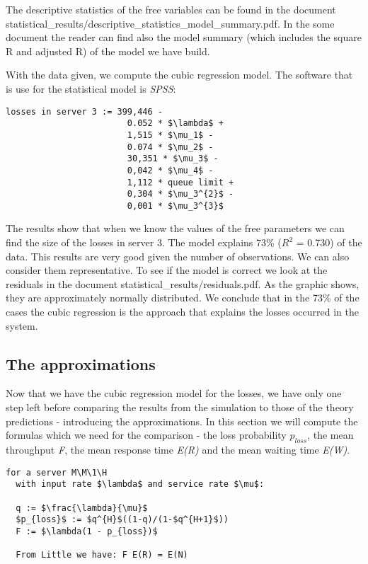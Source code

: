 \documentclass[12pt]{article}
\theoremstyle{plain}
\begin{document}
The descriptive statistics of the free variables can be found in the document
statistical\_results/descriptive\_statistics\_model\_summary.pdf. In the some document
the reader can find also the model summary (which includes the square R and
adjusted R) of the model we have build.


With the data given, we compute the cubic regression model. The software that is
use for the statistical model is \emph{SPSS}:\\

\begin{lstlisting}[frame=single]
  losses in server 3 := 399,446 -
                        0.052 * $\lambda$ +
                        1,515 * $\mu_1$ -
                        0.074 * $\mu_2$ -
                        30,351 * $\mu_3$ -
                        0,042 * $\mu_4$ -
                        1,112 * queue limit +
                        0,304 * $\mu_3^{2}$ -
                        0,001 * $\mu_3^{3}$
\end{lstlisting}

The results show that when we know the values of the free parameters we can find
the size of the losses in server 3. The model explains 73\% ($R^{2}$ = 0.730) of the data. This
results are very good given the number of observations. We can also consider them representative. 
To see if the model is correct we look at the residuals in the document statistical\_results/residuals.pdf.
As the graphic shows, they are approximately normally distributed. We conclude that in the 73\% of the cases the cubic
regression is the approach that explains the losses occurred in the system.

\subsection*{The approximations}

Now that we have the cubic regression model for the losses, we have only one
step left before comparing the results from the simulation to those of the
theory predictions - introducing the approximations. In this section we will
compute the formulas which we need for the comparison - the loss probability
$p_{loss}$, the mean throughput \emph{F}, the mean response time \emph{E(R)}
and the mean waiting time \emph{E(W)}.

\begin{lstlisting}[frame=single]
  for a server M\M\1\H
  with input rate $\lambda$ and service rate $\mu$:

  q := $\frac{\lambda}{\mu}$
  $p_{loss}$ := $q^{H}$((1-q)/(1-$q^{H+1}$))
  F := $\lambda(1 - p_{loss})$
  
  From Little we have: F E(R) = E(N)
\end{lstlisting}
\end{document}
